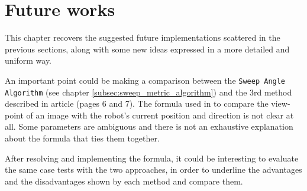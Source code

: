 \section{Future works}
\label{sec:future_works}

This chapter recovers the suggested future implementations scattered in the
previous sections, along with some new ideas expressed in a more detailed and
uniform way.
%

%
An important point could be making a comparison between the \texttt{Sweep Angle
Algorithm} (see chapter \ref{subsec:sweep_metric_algorithm}) and the 3rd method
described in article \cite{sugimoto} (pages 6 and 7).
The formula used in \cite{sugimoto} to compare the view-point of an image with
the robot's current position and direction is not clear at all. Some parameters
are ambiguous and there is not an exhaustive explanation about the formula that
ties them together.
%

%
After resolving and implementing the formula, it could be interesting to evaluate
the same case tests with the two approaches, in order to underline the advantages
and the disadvantages shown by each method and compare them.
